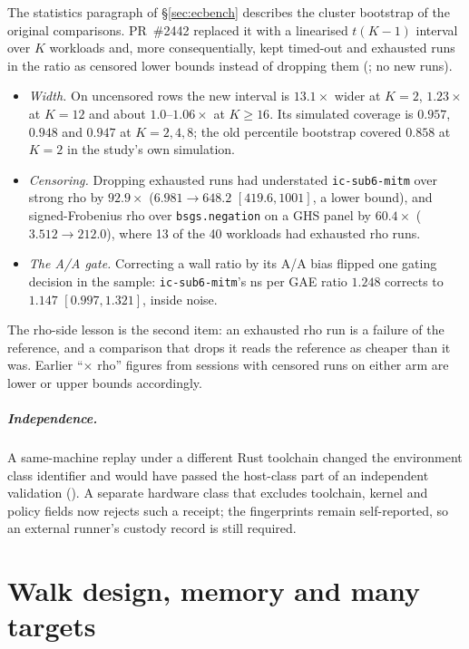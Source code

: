 The statistics paragraph of \S\ref{sec:ecbench} describes the cluster
bootstrap of the original comparisons. PR~\#2442 replaced it with a
linearised $t(K-1)$ interval over $K$ workloads and, more consequentially,
kept timed-out and exhausted runs in the ratio as censored lower bounds
instead of dropping them (;
no new runs).
\begin{itemize}
\item \emph{Width.} On uncensored rows the new interval is $13.1\times$
  wider at $K=2$, $1.23\times$ at $K=12$ and about $1.0$--$1.06\times$ at
  $K\ge16$. Its simulated coverage is $0.957$, $0.948$ and $0.947$ at
  $K=2,4,8$; the old percentile bootstrap covered $0.858$ at $K=2$ in the
  study's own simulation.
\item \emph{Censoring.} Dropping exhausted runs had understated
  \texttt{ic-sub6-mitm} over strong rho by $92.9\times$ ($6.981\to648.2$
  $[419.6,1001]$, a lower bound), and signed-Frobenius rho over
  \texttt{bsgs.negation} on a GHS panel by $60.4\times$ ($3.512\to212.0$),
  where 13 of the 40 workloads had exhausted rho runs.
\item \emph{The A/A gate.} Correcting a wall ratio by its A/A bias flipped
  one gating decision in the sample: \texttt{ic-sub6-mitm}'s ns per GAE
  ratio $1.248$ corrects to $1.147$ $[0.997,1.321]$, inside noise.
\end{itemize}
The rho-side lesson is the second item: an exhausted rho run is a failure
of the reference, and a comparison that drops it reads the reference as
cheaper than it was. Earlier ``$\times$ rho'' figures from sessions with
censored runs on either arm are lower or upper bounds accordingly.

\paragraph{Independence.} A same-machine replay under a different Rust
toolchain changed the environment class identifier and would have passed
the host-class part of an independent validation
(). A separate hardware class
that excludes toolchain, kernel and policy fields now rejects such a
receipt; the fingerprints remain self-reported, so an external runner's
custody record is still required.

\chapter{Walk design, memory and many targets}\label{ch:rhovariants}


